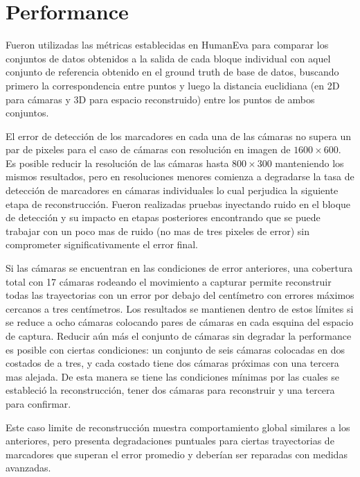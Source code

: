 \section{Performance}

Fueron utilizadas las métricas establecidas en HumanEva \cite{humaneva} para comparar los conjuntos de datos obtenidos a la salida de cada bloque individual con aquel conjunto de referencia obtenido en el ground truth de base de datos, buscando primero la correspondencia entre puntos y luego la distancia euclidiana (en 2D para cámaras y 3D para espacio reconstruido) entre los puntos de ambos conjuntos.



El error de detección de los marcadores en cada una de las cámaras no supera un par de pixeles para el caso de cámaras con resolución en imagen de $1600\times600$. Es posible reducir la resolución de las cámaras hasta $800\times300$ manteniendo los mismos resultados, pero en resoluciones menores comienza a degradarse la tasa de detección de marcadores en cámaras individuales lo cual perjudica la siguiente etapa de reconstrucción. Fueron realizadas pruebas inyectando ruido en el bloque de detección y su impacto en etapas posteriores encontrando que se puede trabajar con un poco mas de ruido (no mas de tres pixeles de error) sin comprometer significativamente el error final.


Si las cámaras se encuentran en las condiciones de error anteriores, una cobertura total con 17 cámaras rodeando el movimiento a capturar permite reconstruir todas las trayectorias con un error por debajo del centímetro con errores máximos cercanos a tres centímetros. Los resultados se mantienen dentro de estos límites si se reduce a ocho cámaras colocando pares de cámaras en cada esquina del espacio de captura. 
Reducir aún más el conjunto de cámaras sin degradar la performance es posible con ciertas condiciones: un conjunto de seis cámaras colocadas en dos costados de a tres, y cada costado tiene dos cámaras próximas con una tercera mas alejada. De esta manera se tiene las condiciones mínimas por las cuales se estableció la reconstrucción, tener dos cámaras para reconstruir y una tercera para confirmar.


Este caso limite de reconstrucción muestra comportamiento global similares a los anteriores, pero presenta degradaciones puntuales para ciertas trayectorias de marcadores que superan el error promedio y deberían ser reparadas con medidas avanzadas.

